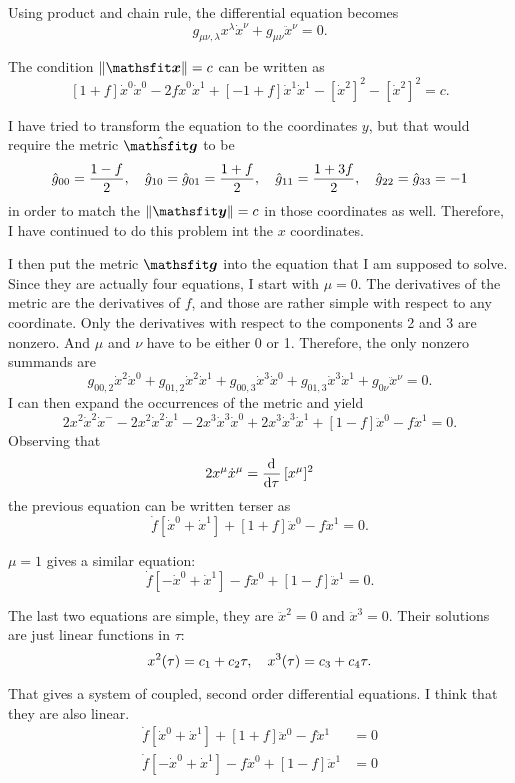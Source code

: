 Using product and chain rule, the differential equation becomes
\[
    g_{\mu\nu,\lambda} x^\lambda \dot x^\nu + g_{\mu\nu} \ddot x^\nu = 0.
\]

The condition $\| \tens x \| = c$ can be written as
\[
    [1+f] \dot x^0 \dot x^0 - 2f \dot x^0 \dot x^1 + [-1+f] \dot x^1 \dot x^1 -
    [\dot x^2]^2 - [\dot x^2]^2 = c.
\]

I have tried to transform the equation to the coordinates $y$, but that would
require the metric $\hat{\tens g}$ to be
\[
    \hat g_{00} = \frac{1-f}2
    ,\quad
    \hat g_{10} = \hat g_{01} = \frac{1+f}2
    ,\quad
    \hat g_{11} = \frac{1+3f}2
    ,\quad
    \hat g_{22} = \hat g_{33} = -1
\]
in order to match the $\| \tens y \| = c$ in those coordinates as well.
Therefore, I have continued to do this problem int the $x$ coordinates.

I then put the metric $\tens g$ into the equation that I am supposed to solve.
Since they are actually four equations, I start with $\mu = 0$. The derivatives
of the metric are the derivatives of $f$, and those are rather simple with
respect to any coordinate. Only the derivatives with respect to the components
2 and 3 are nonzero. And $\mu$ and $\nu$ have to be either 0 or 1. Therefore,
the only nonzero summands are
\[
    g_{00,2} \dot x^2 \dot x^0 + g_{01,2} \dot x^2 \dot x^1 + g_{00,3} \dot x^3
    \dot x^0 + g_{01,3} \dot x^3 \dot x^1 + g_{0\nu} \ddot x^\nu = 0.
\]
I can then expand the occurrences of the metric and yield
\[
    2 x^2 \dot x^2 \dot x^- - 2 x^2 \dot x^2 \dot x^1 - 2 x^3 \dot x^3 \dot x^0
    + 2 x^3 \dot x^3 \dot x^1 + [1-f] \ddot x^0 - f \ddot x^1 = 0.
\]
Observing that
\[
    2 x^\mu \dot x^\mu = \dod{}\tau [x^\mu]^2
\]
the previous equation can be written terser as
\[
    \dot f [\dot x^0 + \dot x^1] + [1+f] \ddot x^0 - f \ddot x^1 = 0.
\]

$\mu = 1$ gives a similar equation:
\[
    \dot f [-\dot x^0 + \dot x^1] - f \ddot x^0 + [1-f] \ddot x^1 = 0.
\]

The last two equations are simple, they are $\ddot x^2 = 0$ and $\ddot x^3 =
0$. Their solutions are just linear functions in $\tau$:
\[
    x^2(\tau) = c_1 + c_2 \tau
    ,\quad
    x^3(\tau) = c_3 + c_4 \tau.
\]

That gives a system of coupled, second order differential equations. I think
that they are also linear.
\begin{align*}
    \dot f [\dot x^0 + \dot x^1] + [1+f] \ddot x^0 - f \ddot x^1 &= 0 \\
    \dot f [-\dot x^0 + \dot x^1] - f \ddot x^0 + [1-f] \ddot x^1 &= 0
\end{align*}

